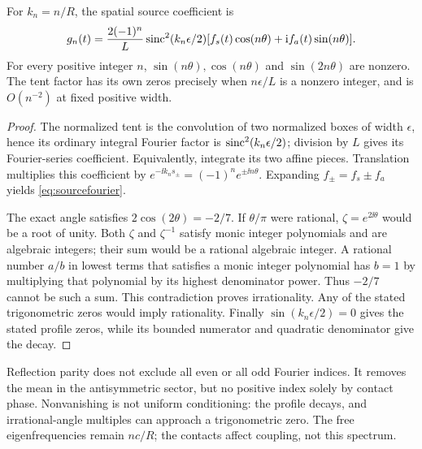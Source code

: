 \begin{proposition}\label{prop:fourier}
For $k_n=n/R$, the spatial source coefficient is
\begin{equation}\label{eq:sourcefourier}
 g_n(t)=\frac{2(-1)^n}{L}\operatorname{sinc}^2(k_n\epsilon/2)
 [f_s(t)\cos(n\theta)+\mathrm i f_a(t)\sin(n\theta)].
\end{equation}
For every positive integer $n$, $\sin(n\theta),\cos(n\theta)$ and $\sin(2n\theta)$ are nonzero. The tent factor has its own zeros precisely when $n\epsilon/L$ is a nonzero integer, and is $O(n^{-2})$ at fixed positive width.
\end{proposition}
\begin{proof}
The normalized tent is the convolution of two normalized boxes of width $\epsilon$, hence its ordinary integral Fourier factor is $\operatorname{sinc}^2(k_n\epsilon/2)$; division by $L$ gives its Fourier-series coefficient. Equivalently, integrate its two affine pieces. Translation multiplies this coefficient by $e^{-\ii k_ns_\pm}=(-1)^ne^{\pm\ii n\theta}$. Expanding $f_\pm=f_s\pm f_a$ yields \eqref{eq:sourcefourier}.

The exact angle satisfies $2\cos(2\theta)=-2/7$. If $\theta/\pi$ were rational, $\zeta=e^{2\ii\theta}$ would be a root of unity. Both $\zeta$ and $\zeta^{-1}$ satisfy monic integer polynomials and are algebraic integers; their sum would be a rational algebraic integer. A rational number $a/b$ in lowest terms that satisfies a monic integer polynomial has $b=1$ by multiplying that polynomial by its highest denominator power. Thus $-2/7$ cannot be such a sum. This contradiction proves irrationality. Any of the stated trigonometric zeros would imply rationality. Finally $\sin(k_n\epsilon/2)=0$ gives the stated profile zeros, while its bounded numerator and quadratic denominator give the decay.
\end{proof}

Reflection parity does not exclude all even or all odd Fourier indices. It removes the mean in the antisymmetric sector, but no positive index solely by contact phase. Nonvanishing is not uniform conditioning: the profile decays, and irrational-angle multiples can approach a trigonometric zero. The free eigenfrequencies remain $nc/R$; the contacts affect coupling, not this spectrum.

